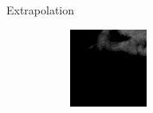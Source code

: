 \documentclass{beamer}
\begin{document}
\begin{frame}{Extrapolation}
\begin{figure}
\begin{subfigure}{.3\textwidth}
\begin{mdframed}[style=red,nobreak=true,align=center]
	        \end{mdframed}
	    \end{subfigure}
	    \begin{subfigure}{.3\textwidth}
	        \centering
	        \includegraphics[width=\linewidth]{fig/extra/5.png}
	    \end{subfigure}
	\end{figure}
\end{frame}
\end{document}
